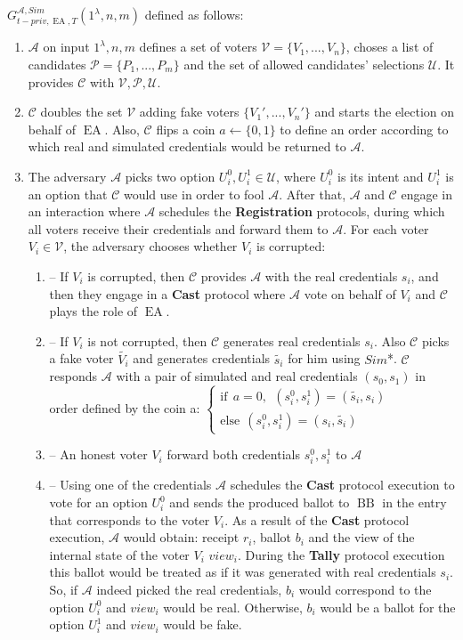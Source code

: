 \documentclass[12pt]{article}
\DeclareMathOperator{\ea}{EA}
\DeclareMathOperator{\bb}{BB}
\begin{document}
 $G_{t-priv,\ea,T}^{\mathcal{A}, Sim}(1^{\lambda},n,m)$ defined as follows:\\
\begin{enumerate}
\item $\mathcal{A}$ on input $1^{\lambda},n,m$ defines a set of voters  $\mathcal{V} = \{V_1,...,V_n\}$, choses a list of candidates  $\mathcal{P} = \{P_1,...,P_m\}$ and the set of allowed candidates' selections $\mathcal{U}$.  It provides $\mathcal{C}$ with $\mathcal{V}, \mathcal{P}, \mathcal{U}$.
\item $\mathcal{C}$ doubles the set $\mathcal{V}$ adding fake voters $ \{V_1',...,V_n'\}$ and starts the election on behalf of $\ea$. Also, $\mathcal{C}$ flips a coin $a \leftarrow \{0,1\}$ to define an order according to which real and simulated credentials would be returned to $\mathcal{A}$. 
\item The adversary $\mathcal{A}$ picks two option $U^0_i,U^1_i \in \mathcal{U}$, where $U^0_i$ is its intent and $U^1_i$ is an option that $\mathcal{C}$ would use in order to fool $\mathcal{A}$.  After that, $\mathcal{A}$  and $\mathcal{C}$ engage in an interaction where $\mathcal{A}$ schedules the \textbf{Registration} protocols, during which all voters receive their credentials and forward them to  $\mathcal{A}$. For each voter $V_i \in \mathcal{V}$, the adversary chooses whether $V_i$ is corrupted:
\begin{enumerate}
\item[] -- If $V_i$ is corrupted, then $\mathcal{C}$ provides $\mathcal{A}$ with the real credentials $s_i$, and then they engage in a \textbf{Cast} protocol where $\mathcal{A}$  vote on behalf of $V_i$ and  $\mathcal{C}$ plays the role of $\ea$.
\item[] --  If $V_i$ is not corrupted, then $\mathcal{C}$ generates real credentials $s_i$. Also $\mathcal{C}$ picks a fake voter $\tilde{V_i}$ and generates credentials $\tilde{s_i}$ for him using $Sim$*.  $\mathcal{C}$  responds  $\mathcal{A}$ with a pair of simulated and real credentials $(s_0,s_1)$ in order defined by the coin a:
$ \begin{cases}
 \text{if} ~~a =0,~~ (s^0_i,s^1_i) = (\tilde{s_i},s_i)  \\ 
 \text{else}~~  (s^0_i,s^1_i) = (s_i,\tilde{s_i})
\end{cases}$
 \item[] -- An honest voter $V_i$ forward both credentials $s^0_i,s^1_i$ to $\mathcal{A}$
\item[] -- Using one of the credentials $\mathcal{A}$ schedules the \textbf{Cast} protocol execution to vote for an option $U^0_i$ and sends the produced ballot to $\bb$ in the entry that corresponds to the voter $V_i$. As a result of the \textbf{Cast} protocol execution, $\mathcal{A}$ would obtain: receipt $r_i$, ballot $b_i$ and the view of the internal state of the voter $V_i$ $view_i$.  During the \textbf{Tally} protocol execution this ballot would be treated as if it was generated with real credentials $s_i$. So, if  $\mathcal{A}$ indeed picked the real credentials, $b_i$ would correspond to the option   $U^0_i$  and $view_i$ would be real. Otherwise, $b_i$ would be a ballot for the option  $U^1_i$ and $view_i$ would be fake. 

\end{enumerate}
\end{enumerate}
\end{document}
